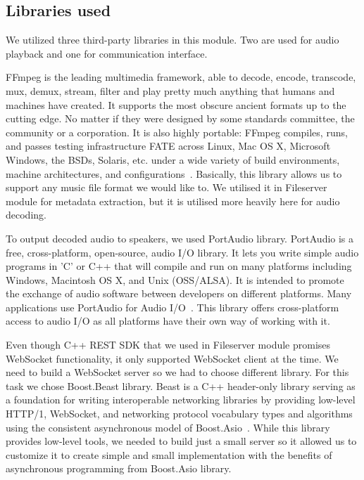 \subsection{Libraries used}
We utilized three third-party libraries in this module. Two are used for audio playback and one for communication interface.
\par
FFmpeg is the leading multimedia framework, able to decode, encode, transcode, mux, demux, stream, filter and play pretty much anything that humans and machines have created. It supports the most obscure ancient formats up to the cutting edge. No matter if they were designed by some standards committee, the community or a corporation. It is also highly portable: FFmpeg compiles, runs, and passes testing infrastructure FATE across Linux, Mac OS X, Microsoft Windows, the BSDs, Solaris, etc. under a wide variety of build environments, machine architectures, and configurations~\citep{ffmpeg}. Basically, this library allows us to support any music file format we  would like to. We utilised it in Fileserver module for metadata extraction, but it is utilised more heavily here for audio decoding.
\par
To output decoded audio to speakers, we used PortAudio library. PortAudio is a free, cross-platform, open-source, audio I/O library. It lets you write simple audio programs in 'C' or C++ that will compile and run on many platforms including Windows, Macintosh OS X, and Unix (OSS/ALSA). It is intended to promote the exchange of audio software between developers on different platforms. Many applications use PortAudio for Audio I/O~\citep{portaudio}. This library offers cross-platform access to audio I/O as all platforms have their own way of working with it.
\par
Even though C++ REST SDK that we used in Fileserver module promises WebSocket functionality, it only supported WebSocket client at the time. We need to build a WebSocket server so we had to choose different library. For this task we chose Boost.Beast library. Beast is a C++ header-only library serving as a foundation for writing interoperable networking libraries by providing low-level HTTP/1, WebSocket, and networking protocol vocabulary types and algorithms using the consistent asynchronous model of Boost.Asio~\citep{beast}. While this library provides low-level tools, we needed to build just a small server so it allowed us to customize it to create simple and small implementation with the benefits of asynchronous programming from Boost.Asio library.

